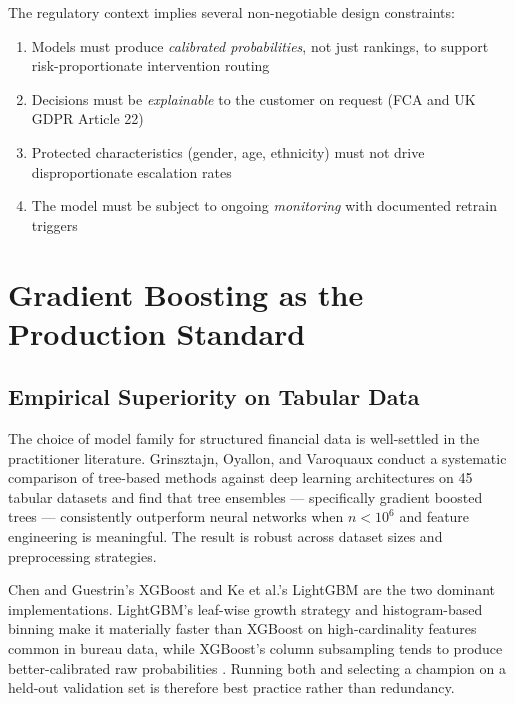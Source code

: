 \documentclass[12pt, a4paper]{article}
\begin{document}
The regulatory context implies several non-negotiable design constraints:

\begin{enumerate}[itemsep=2pt]
    \item Models must produce \emph{calibrated probabilities}, not just rankings,
          to support risk-proportionate intervention routing
    \item Decisions must be \emph{explainable} to the customer on request
          (FCA and UK GDPR Article 22)
    \item Protected characteristics (gender, age, ethnicity) must not drive
          disproportionate escalation rates
    \item The model must be subject to ongoing \emph{monitoring} with documented
          retrain triggers
\end{enumerate}

\section{Gradient Boosting as the Production Standard}

\subsection{Empirical Superiority on Tabular Data}

The choice of model family for structured financial data is well-settled in the
practitioner literature.
Grinsztajn, Oyallon, and Varoquaux \cite{grinsztajn2022} conduct a systematic
comparison of tree-based methods against deep learning architectures on 45 tabular
datasets and find that tree ensembles --- specifically gradient boosted trees ---
consistently outperform neural networks when $n < 10^6$ and feature engineering
is meaningful.
The result is robust across dataset sizes and preprocessing strategies.

Chen and Guestrin's XGBoost \cite{chenguest2016} and Ke et al.'s LightGBM \cite{ke2017}
are the two dominant implementations.
LightGBM's leaf-wise growth strategy and histogram-based binning make it
materially faster than XGBoost on high-cardinality features common in bureau data,
while XGBoost's column subsampling tends to produce better-calibrated raw probabilities
\cite{borisov2022}.
Running both and selecting a champion on a held-out validation set is therefore
best practice rather than redundancy.
\end{document}
